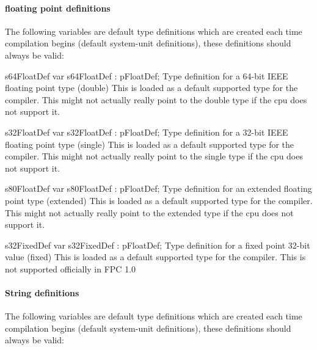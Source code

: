 \documentclass [a4paper,12pt]{article}
\begin{document}
\paragraph{floating point definitions}

The following variables are default type definitions which are created each
time compilation begins (default system-unit definitions), these definitions
should always be valid:

\begin{variable}{s64FloatDef}
\Declaration
var s64FloatDef : pFloatDef;
\Description
Type definition for a 64-bit IEEE floating point type (\textsf{double})
\Notes
This is loaded as a default supported type for the compiler. This might not
actually really point to the double type if the cpu does not support it.
\end{variable}

\begin{variable}{s32FloatDef}
\Declaration
var s32FloatDef : pFloatDef;
\Description
Type definition for a 32-bit IEEE floating point type (\textsf{single})
\Notes
This is loaded as a default supported type for the compiler. This might not
actually really point to the single type if the cpu does not support it.
\end{variable}

\begin{variable}{s80FloatDef}
\Declaration
var s80FloatDef : pFloatDef;
\Description
Type definition for an extended floating point type (\textsf{extended})
\Notes
This is loaded as a default supported type for the compiler. This
might not actually really point to the extended type if the cpu does not
support it.
\end{variable}

\begin{variable}{s32FixedDef}
\Declaration
var s32FixedDef : pFloatDef;
\Description
Type definition for a fixed point 32-bit value (\textsf{fixed})
\Notes
This is loaded as a default supported type for the compiler. This is
not supported officially in FPC 1.0
\end{variable}

\clearpage

\paragraph{String definitions}
The following variables are default type definitions which are created each
time compilation begins (default system-unit definitions), these definitions
should always be valid:
\end{document}
